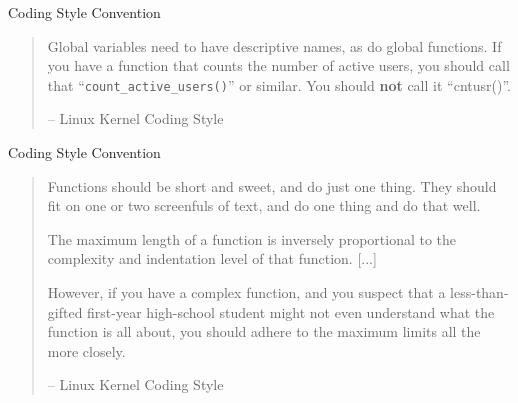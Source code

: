 \documentclass[compress]{beamer}
\begin{document}
\begin{slide}
	\begin{block}{Coding Style Convention}

	\begin{quotation} \scriptsize \normalfont

	Global variables need to have descriptive names, as do global functions.
	If you have a function that counts the number of active users, you should
	call that ``\texttt{count\_active\_users()}'' or similar. You should \textbf{not} call it ``cntusr()''.

	\begin{flushright}-- Linux Kernel Coding Style\end{flushright}
	
	\end{quotation}

	\end{block}
\end{slide}

\begin{slide}
	\begin{block}{Coding Style Convention}

	\begin{quotation} \scriptsize \normalfont

	Functions should be short and sweet, and do just one thing.
	They should fit on one or two screenfuls of text, and do one thing and do that well.

	The maximum length of a function is inversely proportional to the
	complexity and indentation level of that function.
	[...]
	
	However, if you have a complex function, and you suspect that a less-than-gifted first-year high-school student might not even understand what the function is all about, you should adhere to the maximum limits all the more closely.

	\begin{flushright}-- Linux Kernel Coding Style\end{flushright}
	
	\end{quotation}

	\end{block}
\end{slide}
\end{document}
